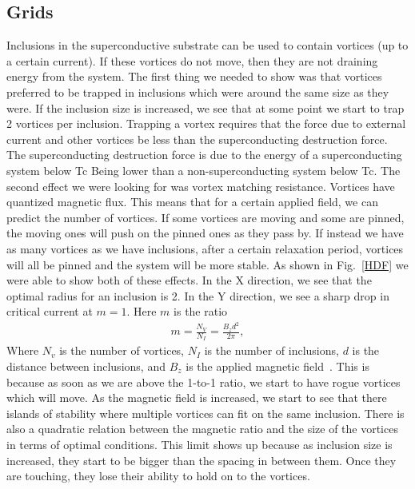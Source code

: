 \subsection{Grids}
Inclusions in the superconductive substrate can be used to contain vortices (up to a certain current). If these vortices do not move, then they are not draining energy from the system. The first thing we needed to show was that vortices preferred to be trapped in inclusions which were around the same size as they were. If the inclusion size is increased, we see that at some point we start to trap 2 vortices per inclusion. Trapping a vortex requires that the force due to external current and other vortices be less than the superconducting destruction force. The superconducting destruction force is due to the energy of a superconducting system below Tc Being lower than a non-superconducting system below Tc. The second effect we were looking for was vortex matching resistance. Vortices have quantized magnetic flux. This means that for a certain applied field, we can predict the number of vortices. If some vortices are moving and some are pinned, the moving ones will push on the pinned ones as they pass by. If instead we have as many vortices as we have inclusions, after a certain relaxation period, vortices will all be pinned and the system will be more stable. As shown in Fig.~\ref{HDF} we were able to show both of these effects. In the X direction, we see that the optimal radius for an inclusion is 2. In the Y direction, we see a sharp drop in critical current at $m=1$. Here $m$ is the ratio
\begin{eqnarray}
m = \frac {N_V} {N_I} = \frac {B_z d^2}{ 2\pi},
\label{mratio}
\end{eqnarray}
Where $N_v$ is the number of vortices, $N_I$ is the number of inclusions, $d$ is the distance between inclusions, and $B_z$ is the applied magnetic field~\cite{Kimmel15}.
 This is because as soon as we are above the 1-to-1 ratio, we start to have rogue vortices which will move. As the magnetic field is increased, we start to see that there islands of stability where multiple vortices can fit on the same inclusion. There is also a quadratic relation between the magnetic ratio and the size of the vortices in terms of optimal conditions. This limit shows up because as inclusion size is increased, they start to be bigger than the spacing in between them. Once they are touching, they lose their ability to hold on to the vortices.

